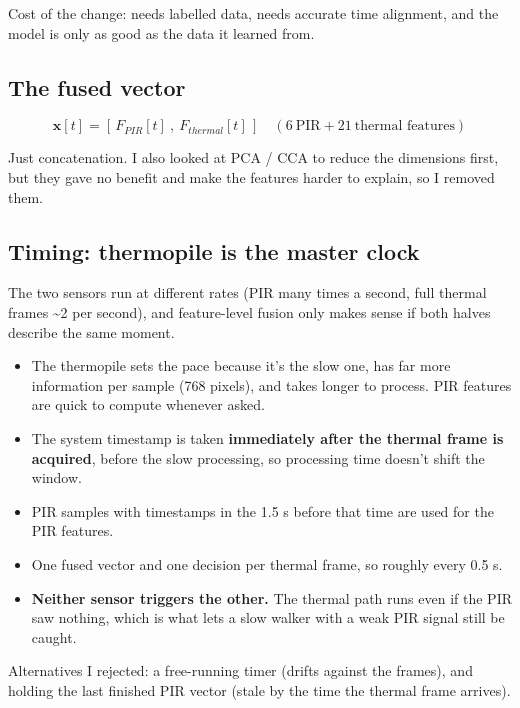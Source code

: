\documentclass[11pt,a4paper]{article}
\providecommand{\tightlist}{\setlength{\itemsep}{0pt}\setlength{\parskip}{0pt}}
\begin{document}
Cost of the change: needs
labelled data, needs accurate
time alignment, and the model
is only as good as the data it
learned from.

\hypertarget{the-fused-vector}{%
\subsection{The fused
vector}\label{the-fused-vector}}

\[
\mathbf{x}[t] = [\,F_{PIR}[t]\ ,\ F_{thermal}[t]\,] \quad (6\ \text{PIR} + 21\ \text{thermal features})
\]

Just concatenation. I also
looked at PCA / CCA to reduce
the dimensions first, but they
gave no benefit and make the
features harder to explain, so
I removed them.

\hypertarget{timing-thermopile-is-the-master-clock}{%
\subsection{Timing: thermopile
is the master
clock}\label{timing-thermopile-is-the-master-clock}}

The two sensors run at
different rates (PIR many
times a second, full thermal
frames \textasciitilde2 per
second), and feature-level
fusion only makes sense if
both halves describe the same
moment.

\begin{itemize}
\tightlist
\item
  The thermopile sets the pace
  because it's the slow one,
  has far more information per
  sample (768 pixels), and
  takes longer to process. PIR
  features are quick to
  compute whenever asked.
\item
  The system timestamp is
  taken \textbf{immediately
  after the thermal frame is
  acquired}, before the slow
  processing, so processing
  time doesn't shift the
  window.
\item
  PIR samples with timestamps
  in the 1.5 s before that
  time are used for the PIR
  features.
\item
  One fused vector and one
  decision per thermal frame,
  so roughly every 0.5 s.
\item
  \textbf{Neither sensor
  triggers the other.} The
  thermal path runs even if
  the PIR saw nothing, which
  is what lets a slow walker
  with a weak PIR signal still
  be caught.
\end{itemize}

Alternatives I rejected: a
free-running timer (drifts
against the frames), and
holding the last finished PIR
vector (stale by the time the
thermal frame arrives).
\end{document}

